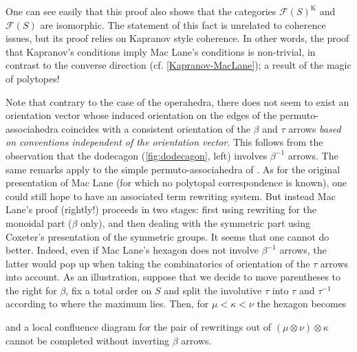 \begin{rem} 
\label{rem:Kapranov-to-MacLane}
One can see easily that this proof  also shows that the categories  $\mathcal{F}(S)^{\mathrm{K}}$ and~$\mathcal{F}(S)$ are isomorphic.  
The statement of this fact is unrelated to coherence issues, but  its proof relies on Kapranov style coherence.
In other words, the  proof that Kapranov's conditions imply Mac Lane's conditions  is non-trivial, in contrast to the converse direction (cf. \cref{Kapranov-MacLane}); a result of the magic of polytopes!
\end{rem}
\begin{rem}
\label{MacLane-Kapranov-Simple}
Note that contrary to the case of the operahedra, there does not seem to exist an orientation vector whose induced orientation on the edges of the permuto-associahedra coincides with a consistent orientation of the $\beta$ and $\tau$ arrows \emph{based on conventions independent of the orientation vector}.
This follows from the observation that the dodecagon (\cref{fig:dodecagon}, left) involves $\beta^{-1}$ arrows.  
The same remarks apply to the simple permuto-associahedra of \cite{baralicSimplePermutoassociahedron2019}.
As for the original presentation of Mac Lane (for which no polytopal correspondence is known), one could still hope to have an associated  term rewriting system.  
But instead Mac Lane's proof (rightly!) proceeds in two stages: first using rewriting for the monoidal part ($\beta$ only), and then dealing with the symmetric part using Coxeter's presentation of the symmetric groups. 
It seems that one cannot do better. 
Indeed, even if  Mac Lane's hexagon does not involve $\beta^{-1}$  arrows, the latter would pop up when taking the combinatorics of orientation of the $\tau$ arrows into account. 
As an illustration, suppose that we decide to move parentheses to the right for $\beta$, fix a total order on $S$ and split the involutive $\tau$ into $\tau$ and $\tau^{-1}$ according to where the maximum lies. 
Then, for $\mu<\kappa<\nu$ the hexagon becomes
 \begin{center}
\end{center}
and a local confluence diagram for the pair of rewritings  out of $(\mu\otimes\nu)\otimes \kappa$ cannot be completed without inverting $\beta$ arrows.
\end{rem}
